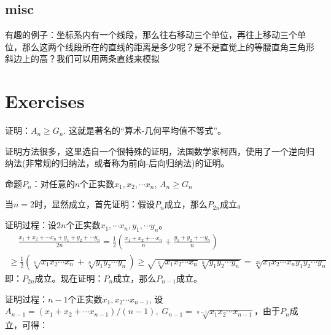 \documentclass[../main.tex]{subfiles}
\begin{document}
\subsection{misc}
有趣的例子：坐标系内有一个线段，那么往右移动三个单位，再往上移动三个单位，那么这两个线段所在的直线的距离是多少呢？是不是直觉上的等腰直角三角形斜边上的高？我们可以用两条直线来模拟

\section{Exercises}
  \begin{exercise}
   证明：$A_n \ge G_n$. 这就是著名的“算术-几何平均值不等式”。
 \end{exercise}
 \begin{solution}
   证明方法很多，这里选自一个很特殊的证明，法国数学家柯西，使用了一个逆向归纳法(非常规的归纳法，或者称为前向-后向归纳法)的证明。

   命题$P_n$：对任意的$n$个正实数$x_1,x_2,\cdots x_n$, $A_n\ge G_n$

   当$n=2$时，显然成立，首先证明：假设$P_n$成立，那么$P_{2n}$成立。

   证明过程：设$2n$个正实数$x_1,\cdots x_n, y_1,\cdots y_n$。
   \begin{multline*}
     \phantom{xx}\frac{x_1+x_2+\cdots x_n+y_1+y_2+\cdots y_n}{2n}=\frac{1}{2}\left(\frac{x_1+x_2+\cdots x_n}{n}+\frac{y_1+y_2+\cdots y_n}{n}\right)\\
     \ge \frac{1}{2}(\sqrt[n]{x_1x_2\cdots x_n}+\sqrt[n]{y_1y_2\cdots y_n}) \ge \sqrt{\sqrt[n]{x_1x_2\cdots x_n} \sqrt[n]{y_1y_2\cdots y_n}}=\sqrt[2n]{x_1x_2\cdots x_ny_1y_2\cdots y_n}
   \end{multline*}
   即：$P_{2n}$成立。现在证明：$P_n$成立，那么$P_{n-1}$成立。

   证明过程：$n-1$个正实数$x_1,x_2\cdots x_{n-1}$, 设$A_{n-1}=(x_1+x_2+\cdots x_{n-1})/(n-1), \; G_{n-1}=\sqrt[n-1]{x_1x_2\cdots x_{n-1}}$，由于$P_n$成立，可得：


\end{solution}
\end{document}
